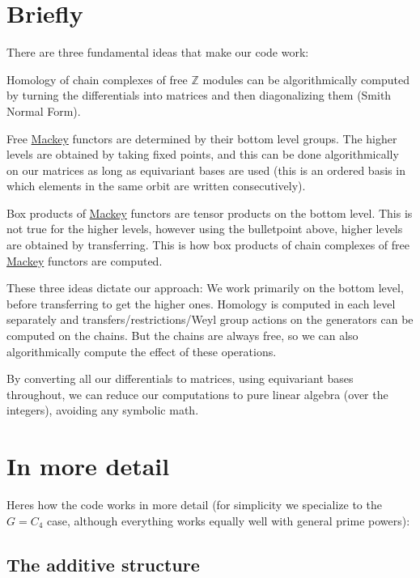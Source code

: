 \hypertarget{math_Briefly}{}\section{Briefly}\label{math_Briefly}
There are three fundamental ideas that make our code work\+:


\begin{DoxyItemize}
\item Homology of chain complexes of free $\mathbb Z$ modules can be algorithmically computed by turning the differentials into matrices and then diagonalizing them (Smith Normal Form).
\item Free \hyperlink{namespaceMackey}{Mackey} functors are determined by their bottom level groups. The higher levels are obtained by taking fixed points, and this can be done algorithmically on our matrices as long as equivariant bases are used (this is an ordered basis in which elements in the same orbit are written consecutively).
\item Box products of \hyperlink{namespaceMackey}{Mackey} functors are tensor products on the bottom level. This is not true for the higher levels, however using the bulletpoint above, higher levels are obtained by transferring. This is how box products of chain complexes of free \hyperlink{namespaceMackey}{Mackey} functors are computed.
\end{DoxyItemize}

These three ideas dictate our approach\+: We work primarily on the bottom level, before transferring to get the higher ones. Homology is computed in each level separately and transfers/restrictions/\+Weyl group actions on the generators can be computed on the chains. But the chains are always free, so we can also algorithmically compute the effect of these operations.

By converting all our differentials to matrices, using equivariant bases throughout, we can reduce our computations to pure linear algebra (over the integers), avoiding any symbolic math.\hypertarget{math_imd}{}\section{In more detail}\label{math_imd}
Here\textquotesingle{}s how the code works in more detail (for simplicity we specialize to the $G=C_4$ case, although everything works equally well with general prime powers)\+:\hypertarget{math_add}{}\subsection{The additive structure}\label{math_add}

